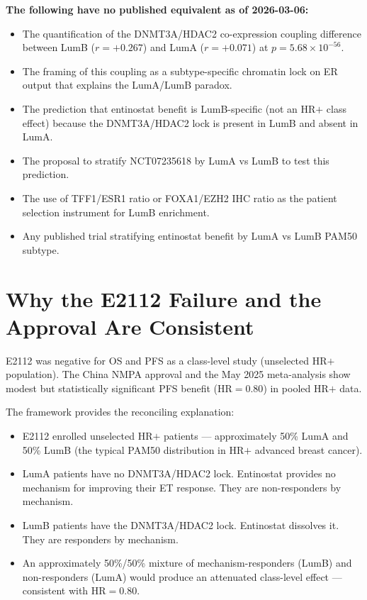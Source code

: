 \documentclass[12pt, a4paper]{article}
\begin{document}
\begin{center}
\colorbox{novelbox}{
\begin{minipage}{0.88\textwidth}
\vspace{0.5em}
\textbf{The following have no published equivalent
as of 2026-03-06:}
\begin{itemize}[noitemsep]
    \item The quantification of the DNMT3A/HDAC2
    co-expression coupling difference between LumB
    ($r=+0.267$) and LumA ($r=+0.071$) at
    $p=5.68\times10^{-56}$.
    \item The framing of this coupling as a
    subtype-specific chromatin lock on ER output
    that explains the LumA/LumB paradox.
    \item The prediction that entinostat benefit
    is LumB-specific (not an HR$+$ class effect)
    because the DNMT3A/HDAC2 lock is present in
    LumB and absent in LumA.
    \item The proposal to stratify NCT07235618
    by LumA vs LumB to test this prediction.
    \item The use of TFF1/ESR1 ratio or
    FOXA1/EZH2 IHC ratio as the patient selection
    instrument for LumB enrichment.
    \item Any published trial stratifying entinostat
    benefit by LumA vs LumB PAM50 subtype.
\end{itemize}
\vspace{0.5em}
\end{minipage}}
\end{center}

\section{Why the E2112 Failure and the Approval
Are Consistent}

E2112 was negative for OS and PFS as a class-level
study (unselected HR$+$ population). The China NMPA
approval and the May 2025 meta-analysis show modest
but statistically significant PFS benefit
(HR$=0.80$) in pooled HR$+$ data.

The framework provides the reconciling explanation:
\begin{itemize}
    \item E2112 enrolled unselected HR$+$ patients ---
    approximately 50\% LumA and 50\% LumB (the
    typical PAM50 distribution in HR$+$ advanced
    breast cancer).
    \item LumA patients have no DNMT3A/HDAC2 lock.
    Entinostat provides no mechanism for improving
    their ET response. They are non-responders by
    mechanism.
    \item LumB patients have the DNMT3A/HDAC2 lock.
    Entinostat dissolves it. They are responders
    by mechanism.
    \item An approximately 50\%/50\% mixture of
    mechanism-responders (LumB) and
    non-responders (LumA) would produce an
    attenuated class-level effect ---
    consistent with HR$=0.80$.
\end{itemize}
\end{document}
